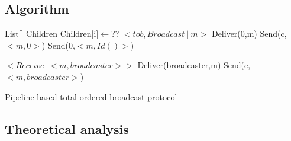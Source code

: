 \documentclass[a4paper]{article}
\begin{document}
        \subsection{Algorithm}
        \begin{algorithm}[H]
            \centering
            \begin{algorithmic}[5]
                \Data
		\State List[] Children
                \EndData
                \Init
		\State Children[i]$\gets$??
		\EndFor
                \EndInit
                \Event $< tob,Broadcast\ |\ m> $
                \State Deliver(0,m)
                \State Send(c,$<m,0>$)
		\EndFor
		\Else
		\State Send(0,$<m,Id()>$)
	        \EndIf
                \EndEvent

                \Event $<Receive\ | <m,broadcaster>>$
                \State Deliver(broadcaster,m)
                \State Send(c,$<m,broadcaster>$)
		\EndFor
                \EndEvent
            \end{algorithmic}
            \caption{Pipeline based total ordered broadcast protocol}
        \end{algorithm}

        \subsection{Theoretical analysis}
\end{document}
